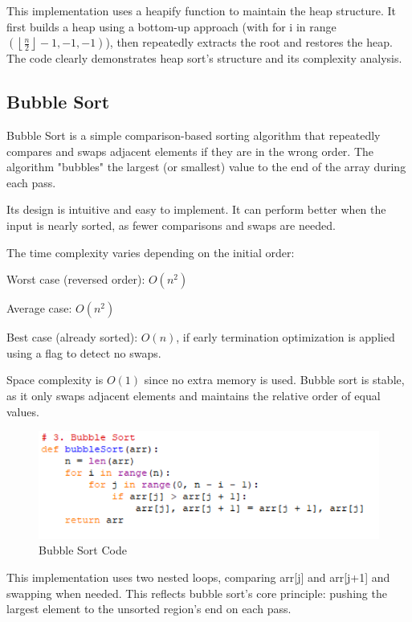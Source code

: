 \documentclass[sigconf]{acmart}
\begin{document}
This implementation uses a heapify function to maintain the heap structure. It first builds a heap using a bottom-up approach (with for i in range$(\left\lfloor \frac{n}{2} \right\rfloor - 1, -1, -1)$), then repeatedly extracts the root and restores the heap. The code clearly demonstrates heap sort's structure and its complexity analysis.


\subsection{Bubble Sort}
Bubble Sort is a simple comparison-based sorting algorithm that repeatedly compares and swaps adjacent elements if they are in the wrong order. The algorithm "bubbles" the largest (or smallest) value to the end of the array during each pass.

Its design is intuitive and easy to implement. It can perform better when the input is nearly sorted, as fewer comparisons and swaps are needed.

The time complexity varies depending on the initial order:

Worst case (reversed order): $O(n^2)$

Average case: $O(n^2)$

Best case (already sorted): $O(n)$, if early termination optimization is applied using a flag to detect no swaps.

Space complexity is $O(1)$ since no extra memory is used. Bubble sort is stable, as it only swaps adjacent elements and maintains the relative order of equal values.

\begin{figure}[t]
\centering
\includegraphics[width=0.85\linewidth]{figures/003.pdf}
\vspace{-0.3cm}
\caption{Bubble Sort Code}  
\vspace{-0.35cm}
\label{fig:proportion}
\end{figure}

This implementation uses two nested loops, comparing arr[j] and arr[j+1] and swapping when needed. This reflects bubble sort's core principle: pushing the largest element to the unsorted region's end on each pass.
\end{document}
